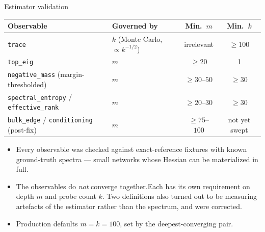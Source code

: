 \documentclass[aspectratio=169,10pt]{beamer}
\begin{document}
\begin{frame}{Estimator validation}
\centering\footnotesize
\begin{tabular}{llcc}
\toprule
Observable & Governed by & Min.\ $m$ & Min.\ $k$ \\
\midrule
\texttt{trace} & $k$ (Monte Carlo, $\propto k^{-1/2}$) & irrelevant & $\geq 100$ \\
\texttt{top\_eig} & $m$ & $\geq 20$ & 1 \\
\texttt{negative\_mass} (margin-thresholded) & $m$ & $\geq 30$--$50$ & $\geq 30$ \\
\texttt{spectral\_entropy} / \texttt{effective\_rank} & $m$ & $\geq 20$--$30$ & $\geq 30$ \\
\texttt{bulk\_edge} / \texttt{conditioning} (post-fix) & $m$ & $\geq 75$--$100$ & not yet swept \\
\bottomrule
\end{tabular}
\vspace{8pt}

\raggedright
\begin{itemize}\footnotesize
  \item Every observable was checked against exact-reference fixtures with known
        ground-truth spectra --- small networks whose Hessian can be
        materialized in full.
  \item The observables do \emph{not} converge together.Each
        has its own requirement on depth $m$ and probe count $k$. Two definitions also turned out
        to be measuring artefacts of the estimator rather than the spectrum, and
        were corrected.
  \item Production defaults $m = k = 100$, set by the deepest-converging pair.
\end{itemize}
\end{frame}
\end{document}
